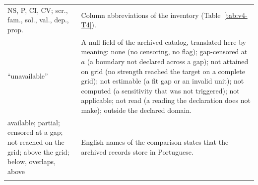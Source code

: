\begin{table}[htbp]
\begin{tabular}{@{}>{\raggedright\arraybackslash}p{}>{\raggedright\arraybackslash}p{}@{}}
NS, P, CI, CV; scr., fam., sol., val., dep., prop. & Column abbreviations of the inventory (Table~\ref{tab:v4-T4}). \\
``unavailable'' & A null field of the archived catalog, translated here by meaning: none (no censoring, no flag); gap-censored at $a$ (a boundary not declared across a gap); not attained on grid (no strength reached the target on a complete grid); not estimable (a fit gap or an invalid unit); not computed (a sensitivity that was not triggered); not applicable; not read (a reading the declaration does not make); outside the declared domain. \\
available; partial; censored at a gap; not reached on the grid; above the grid; below, overlaps, above & English names of the comparison states that the archived records store in Portuguese. \\
\botrule
\end{tabular}
\end{table}

\clearpage
